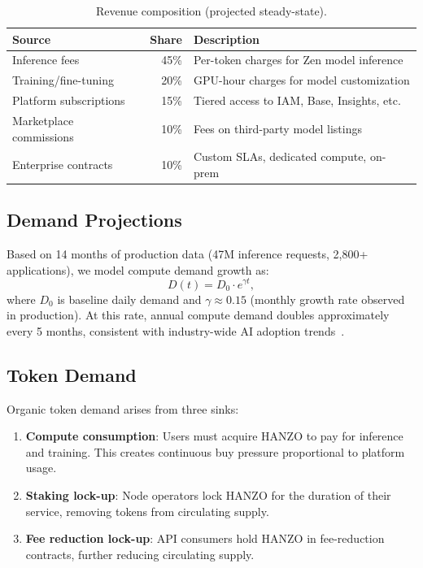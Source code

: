 \documentclass[11pt]{article}
\begin{document}
\begin{table}[H]
\centering
\small
\begin{tabular}{lrp{5cm}}
\toprule
\textbf{Source} & \textbf{Share} & \textbf{Description} \\
\midrule
Inference fees & 45\% & Per-token charges for Zen model inference \\
Training/fine-tuning & 20\% & GPU-hour charges for model customization \\
Platform subscriptions & 15\% & Tiered access to IAM, Base, Insights, etc. \\
Marketplace commissions & 10\% & Fees on third-party model listings \\
Enterprise contracts & 10\% & Custom SLAs, dedicated compute, on-prem \\
\bottomrule
\end{tabular}
\caption{Revenue composition (projected steady-state).}
\label{tab:revenue}
\end{table}

\subsection{Demand Projections}

Based on 14 months of production data (47M inference requests, 2,800+
applications), we model compute demand growth as:
\begin{equation}
D(t) = D_0 \cdot e^{\gamma t},
\end{equation}
where $D_0$ is baseline daily demand and $\gamma \approx 0.15$ (monthly growth
rate observed in production). At this rate, annual compute demand doubles
approximately every 5 months, consistent with industry-wide AI adoption
trends~\cite{mckinseyai2024}.

\subsection{Token Demand}

Organic token demand arises from three sinks:

\begin{enumerate}[leftmargin=1.4em]
    \item \textbf{Compute consumption}: Users must acquire HANZO to pay for
    inference and training. This creates continuous buy pressure proportional to
    platform usage.
    \item \textbf{Staking lock-up}: Node operators lock HANZO for the duration of
    their service, removing tokens from circulating supply.
    \item \textbf{Fee reduction lock-up}: API consumers hold HANZO in
    fee-reduction contracts, further reducing circulating supply.
\end{enumerate}
\end{document}

